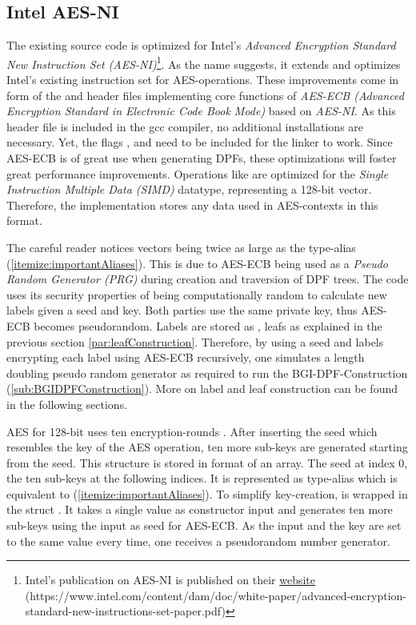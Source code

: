\subsection*{Intel AES-NI} \label{subsub:implementationAesni}
The existing source code is optimized for Intel's \textit{Advanced Encryption Standard New Instruction Set (AES-NI)}\footnote{Intel's publication on AES-NI is published on their \hyperlink{https://www.intel.com/content/dam/doc/white-paper/advanced-encryption-standard-new-instructions-set-paper.pdf}{website} (https://www.intel.com/content/dam/doc/white-paper/advanced-encryption-standard-new-instructions-set-paper.pdf)}.
As the name suggests, it extends and optimizes Intel's existing instruction set for AES-operations.
These improvements come in form of the  and  header files implementing core functions of \textit{AES-ECB (Advanced Encryption Standard in Electronic Code Book Mode)} based on \textit{AES-NI}.
As this header file is included in the gcc compiler, no additional installations are necessary.
Yet, the flags , and  need to be included for the linker to work.
Since AES-ECB is of great use when generating DPFs, these optimizations will foster great performance improvements.
Operations like  are optimized for the  \textit{Single Instruction Multiple Data (SIMD)} datatype, representing a 128-bit vector.
Therefore, the implementation stores any data used in AES-contexts in this format.

The careful reader notices  vectors being twice as large as the  type-alias  (\ref{itemize:importantAliases}).
This is due to AES-ECB being used as a \textit{Pseudo Random Generator (PRG)} during creation and traversion of DPF trees.
The code uses its security properties of being computationally random \cite{rijmen2001advanced} to calculate new labels given a seed and key.
Both parties use the same private key, thus AES-ECB becomes pseudorandom.
Labels are stored as , leafs as explained in the previous section \ref{par:leafConstruction}.
Therefore, by using a  seed and labels encrypting each label using AES-ECB recursively, one simulates a length doubling pseudo random generator \cite{vadapalli2023duoram} as required to run the BGI-DPF-Construction (\ref{sub:BGIDPFConstruction}).
More on label and leaf construction can be found in the following sections.

AES for 128-bit uses ten encryption-rounds \cite{rijmen2001advanced}.
After inserting the seed which resembles the key of the AES operation, ten more sub-keys are generated starting from the seed.
This structure is stored in format of an  array.
The seed at index $0$, the ten sub-keys at the following indices.
It is represented as type-alias  which is equivalent to  (\ref{itemize:importantAliases}).
To simplify key-creation,  is wrapped in the struct .
It takes a single  value as constructor input and generates ten more sub-keys using the input as seed for AES-ECB.
As the input and the key are set to the same value every time, one receives a pseudorandom number generator.

